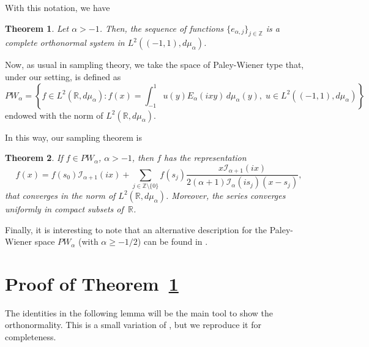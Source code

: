 \documentclass[11pt]{amsart}
\theoremstyle{plain}
\newtheorem{Theo}{Theorem}
\begin{document}
With this notation, we have

\begin{Theo}
\label{theo:ortho}
Let $\alpha > -1$. Then, the sequence of functions
$\{e_{\alpha,j}\}_{j\in \mathbb{Z}}$
is a complete orthonormal system in $L^2((-1,1),d\mu_{\alpha})$.
\end{Theo}

Now, as usual in sampling theory, we take the space of Paley-Wiener type that,
under our setting, is defined as
\begin{equation}
\label{eq:PWa}
  PW_\alpha = \left\{ f\in L^2(\mathbb{R},d\mu_\alpha):
  f(x) = \int_{-1}^{1}u(y)E_{\alpha}(ixy)\,d\mu_{\alpha}(y),\;
  u\in L^{2}((-1,1),d\mu_\alpha) \right\}
\end{equation}
endowed with the norm of $L^{2}(\mathbb{R},d\mu_\alpha)$.

In this way, our sampling theorem is

\begin{Theo}
\label{theo:sampling}
If $f\in PW_\alpha$, $\alpha > -1$, then $f$ has the representation
\[
  f(x) = f(s_0) \mathcal{I}_{\alpha+1}(ix)
  + \sum_{j\in\mathbb{Z} \setminus\{0\}} f(s_j)
    \frac{x\mathcal{I}_{\alpha+1}(ix)}{2(\alpha+1)\mathcal{I}_{\alpha}(is_j)(x-s_j)},
\]
that converges in the norm of $L^{2}(\mathbb{R},d\mu_\alpha)$.
Moreover, the series converges uniformly in compact subsets of~$\mathbb{R}$.
\end{Theo}

Finally, it is interesting to note that an alternative description for the Paley-Wiener space $PW_\alpha$ (with $\alpha \ge -1/2$) can be found in \cite[\S\,5]{And-Jeu}.

\section{Proof of Theorem~\ref{theo:ortho}}
\label{seq:ortho}

The identities in the following lemma will be the main tool to show the orthonormality.
This is a small variation of \cite[Lemma~1]{BCV}, but we reproduce it for completeness.
\end{document}
